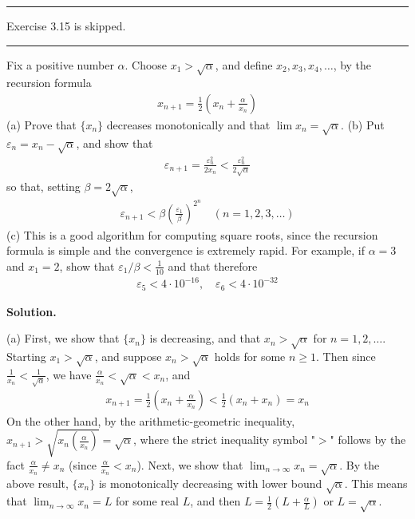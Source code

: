 \documentclass[12pt]{article}
\theoremstyle{definition}
\begin{document}
\bigskip\noindent\hrule\bigskip

Exercise 3.15 is skipped.


\bigskip\noindent\hrule\bigskip

Fix a positive number $\alpha$. Choose $x_1>\sqrt{\alpha}$, and define $x_2,x_3,x_4,\ldots$, by the recursion formula
\begin{align*}
x_{n+1}=\frac{1}{2}\left(x_n+\frac{\alpha}{x_n}\right)
\end{align*}
(a) Prove that $\{x_n\}$ decreases monotonically and that $\lim x_n=\sqrt{\alpha}$.
(b) Put $\varepsilon_n=x_n-\sqrt{\alpha}$, and show that
\begin{align*}
\varepsilon_{n+1}=\frac{\varepsilon_n^2}{2x_n}<\frac{\varepsilon_n^2}{2\sqrt{\alpha}}
\end{align*}
so that, setting $\beta=2\sqrt{\alpha}$,
\begin{align*}
\varepsilon_{n+1}<\beta\left(\frac{\varepsilon_1}{\beta}\right)^{2^n}\quad(n=1,2,3,\ldots)
\end{align*}
(c) This is a good algorithm for computing square roots, since the recursion formula is simple and the convergence is extremely rapid. For example, if $\alpha=3$ and $x_1=2$, show that $\varepsilon_1/\beta<\frac{1}{10}$ and that therefore
\begin{align*}
\varepsilon_5<4\cdot 10^{-16},\quad \varepsilon_6<4\cdot 10^{-32}
\end{align*}

\smallskip
\noindent\textbf{Solution.}\quad

(a) First, we show that $\{x_n\}$ is decreasing, and that $x_n>\sqrt{\alpha}$ for $n=1,2,\ldots$. Starting $x_1>\sqrt{\alpha}$, and suppose $x_n>\sqrt{\alpha}$ holds for some $n\ge 1$. Then since $\frac{1}{x_n}<\frac{1}{\sqrt{\alpha}}$, we have $\frac{\alpha}{x_n}<\sqrt{\alpha}<x_n$, and
\begin{align*}
x_{n+1}
=\frac{1}{2}\left(x_n+\frac{\alpha}{x_n}\right)
<\frac{1}{2}\left(x_n+x_n\right)
=x_n
\end{align*}
On the other hand, by the arithmetic-geometric inequality, $x_{n+1}>\sqrt{x_n\left(\frac{\alpha}{x_n}\right)}=\sqrt{\alpha}$, where the strict inequality symbol "$>$" follows by the fact $\frac{\alpha}{x_n}\ne x_n$ (since $\frac{\alpha}{x_n}<x_n$). Next, we show that $\lim_{n\to\infty}x_n=\sqrt{\alpha}$. By the above result, $\{x_n\}$ is monotonically decreasing with lower bound $\sqrt{\alpha}$. This means that $\lim_{n\to\infty}x_n=L$ for some real $L$, and then $L=\frac{1}{2}\left(L+\frac{\alpha}{L}\right)$ or $L=\sqrt{\alpha}$.
\end{document}
